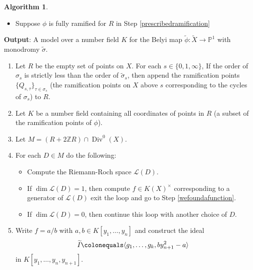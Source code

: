 \documentclass{dcthesis}
\newcommand{\PP}{\mathbb P}
\newcommand{\ZZ}{\mathbb Z}
\newcommand{\mm}[1]{{\color{blue} \sf MM: [#1]}}
\newcommand{\wt}[1]{\widetilde{#1}}
\newcommand{\LL}{\mathscr L}
\DeclareMathOperator{\Div}{Div}
\numberwithin{equation}{section}
\theoremstyle{definition}
\newtheorem{alg}[equation]{Algorithm}
\theoremstyle{remark}
\begin{document}
{{\begin{alg}
\begin{itemize}
        \item
          Suppose $\phi$ is fully ramified for
          $R$ in Step \ref{prescribedramification}
      \end{itemize}
      \textbf{Output}: A model over a number field $K$ for the Belyi map
      $\wt{\phi}:\wt{X}\to\PP^1$
      with monodromy $\wt{\sigma}$.
      \begin{enumerate}
        \item
          \label{prescribedramification}
          Let $R$ be the empty set of points on $X$.
          For each $s\in\{0,1,\infty\}$,
          If the order of $\sigma_s$ is strictly less than the order of $\wt{\sigma}_s$,
          then append the ramification points
          $\{Q_{s,\tau}\}_{\tau\in\sigma_s}$
          (the ramification points on $X$ above $s$ corresponding to the cycles of $\sigma_s$)
          to $R$.
        \item
          Let $K$ be a number field containing all coordinates of
          points in $R$
          (a subset of the ramification points of $\phi$).
        \item
          Let $M = (R+2\ZZ R)\cap\Div^0(X)$.
        \item
          \label{ramificationfulloop}
          For each $D\in M$ do the following:
          \begin{itemize}
            \item
              Compute the Riemann-Roch space $\LL(D)$.
            \item
              If $\dim\LL(D) = 1$, then
              compute $f\in K(X)^\times$
              corresponding to a generator
              of $\LL(D)$
              exit the loop
              and go to Step \ref{wefoundafunction}.
            \item
              If $\dim\LL(D) = 0$,
              then continue this loop
              with another choice of $D$.
          \end{itemize}
        \item
          \label{wefoundafunction}
          Write $f=a/b$ with $a,b\in K[y_1,\dots,y_n]$ and construct the ideal
          \[
            \wt{I}\colonequals\langle g_1,\dots,g_k, by_{n+1}^2-a\rangle
          \]
          in $K[y_1,\dots,y_n,y_{n+1}]$.

\end{enumerate}
\end{alg}}}
\end{document}
